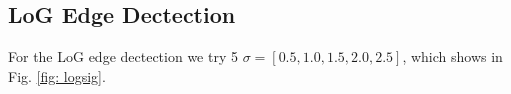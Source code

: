 \documentclass[final]{cvpr}
\begin{document}
\begin{appendices}
\subsection{LoG Edge Dectection}\label{sec: logresult}
For the LoG edge dectection we try 5 $\sigma =[0.5,1.0,1.5,2.0,2.5]$, which shows in Fig. \ref{fig: logsig}.

\begin{figure}[htbp]
  \centering
  \quad
  \quad
  \quad
\end{figure}
\end{appendices}
\end{document}
